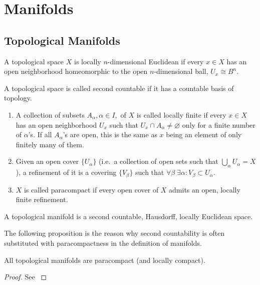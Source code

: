 \documentclass[english,letterpaper]{article}%
\numberwithin{equation}{section}
\numberwithin{figure}{section}
\numberwithin{table}{section}
\theoremstyle{definition}
\theoremstyle{definition}
\theoremstyle{definition}
\theoremstyle{plain}
\theoremstyle{plain}
\theoremstyle{plain}
\theoremstyle{plain}
\theoremstyle{remark}
\theoremstyle{remark}
\begin{document}
\section{Manifolds}

\subsection{Topological Manifolds}
\begin{defn}
A topological space $X$ is locally $n$-dimensional Euclidean if every $x\in X$ has an open neighborhood homeomorphic to the open $n$-dimensional ball, $U_x\cong B^n$. 
\end{defn}
\begin{defn}
A topological space is called second countable if it has a countable basis of topology.
\end{defn}
\begin{defn}[Paracompactness]
\begin{enumerate}
    \item A collection of subsets $A_\alpha, \alpha \in I,$ of $X$ is called locally finite if every $x\in X$ has an open neighborhood $U_x$ such that $U_x\cap A_\alpha \neq \varnothing$ only for a finite number of $\alpha$'s. If all $A_\alpha$'s are open, this is the same as $x$ being an element of only finitely many of them.
    \item Given an open cover $\{U_\alpha\}$ (i.e.\ a collection of open sets such that $\bigcup_\alpha U_\alpha=X$), a refinement of it is a covering $\{V_\beta \}$ such that $\forall \beta \;\exists \alpha: V_\beta \subset U_\alpha $.
    \item $X$ is called paracompact if every open cover of $X$ admits an open, locally finite refinement.
\end{enumerate}
\end{defn}
\begin{defn}
A topological manifold is a second countable, Hausdorff, locally Euclidean space.
\end{defn}
The following proposition is the reason why second countability is often substituted with paracompactness in the definition of manifolds.
\begin{prop}
All topological manifolds are paracompact (and locally compact).
\end{prop}
\begin{proof}
See \cite[Thm. 1.15]{Lee}
\end{proof}
\end{document}
